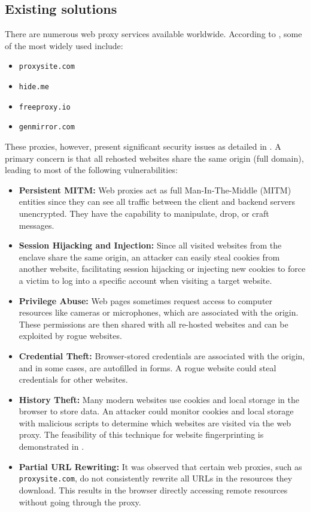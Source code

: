 \subsection{Existing solutions}
There are numerous web proxy services available worldwide. According to \cite{similar-web}, some of the most widely used include:
\begin{itemize}
    \item \texttt{proxysite.com} \cite{proxy-site}
    \item \texttt{hide.me} \cite{hideme}
    \item \texttt{freeproxy.io} \cite{freeproxy}
    \item \texttt{genmirror.com} \cite{genmirror}
\end{itemize}

These proxies, however, present significant security issues as detailed in \cite{watanabe2020melting}. A primary concern is that all rehosted websites share the same origin (full domain), leading to most of the following vulnerabilities:
\begin{itemize}
    \item \textbf{Persistent MITM:} Web proxies act as full Man-In-The-Middle (MITM) entities since they can see all traffic between the client and backend servers unencrypted. They have the capability to manipulate, drop, or craft messages.
    \item \textbf{Session Hijacking and Injection:} Since all visited websites from the enclave share the same origin, an attacker can easily steal cookies from another website, facilitating session hijacking or injecting new cookies to force a victim to log into a specific account when visiting a target website.
    \item \textbf{Privilege Abuse:} Web pages sometimes request access to computer resources like cameras or microphones, which are associated with the origin. These permissions are then shared with all re-hosted websites and can be exploited by rogue websites.
    \item \textbf{Credential Theft:} Browser-stored credentials are associated with the origin, and in some cases, are autofilled in forms. A rogue website could steal credentials for other websites.
    \item \textbf{History Theft:} Many modern websites use cookies and local storage in the browser to store data. An attacker could monitor cookies and local storage with malicious scripts to determine which websites are visited via the web proxy. The feasibility of this technique for website fingerprinting is demonstrated in \cite{watanabe2020melting}.
    \item \textbf{Partial URL Rewriting:} It was observed that certain web proxies, such as \texttt{proxysite.com}, do not consistently rewrite all URLs in the resources they download. This results in the browser directly accessing remote resources without going through the proxy.
\end{itemize}


